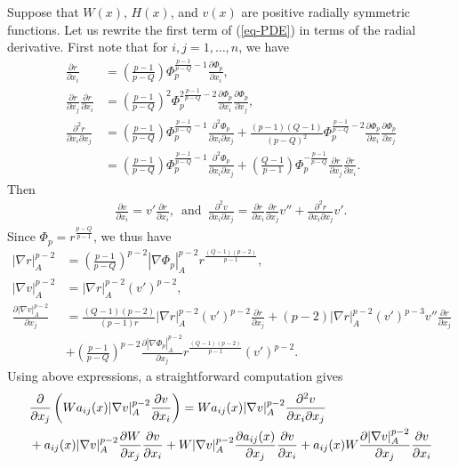 \documentclass[a4paper,12pt,reqno]{amsart}
\renewcommand\eqref[1]{(\ref{#1})} %
\theoremstyle{theorem}
\numberwithin{equation}{section}
\theoremstyle{plain}
\theoremstyle{definition}
\theoremstyle{defi}
\begin{document}
Suppose that $W(x)$, $H(x)$, and $v(x)$ are positive radially symmetric functions. 
Let us rewrite the first term of \eqref{eq-PDE} in terms of the radial derivative. First note that for $i,j=1,\ldots,n$, we have
\begin{align}
\frac{\partial r}{\partial x_i} &= \left(\frac{p-1}{p-Q}\right) \Phi_p^{\frac{p-1}{p-Q}-1} \frac{\partial \Phi_p}{\partial x_i},\label{2.5}\\
\frac{\partial r}{\partial x_j}	\frac{\partial r}{\partial x_i} &= \left(\frac{p-1}{p-Q}\right)^2 \Phi_p^{2\frac{p-1}{p-Q}-2} \frac{\partial \Phi_p}{\partial x_i}\frac{\partial \Phi_p}{\partial x_j},\\
\frac{\partial^2 r}{\partial x_i \partial x_j} &= \left(\frac{p-1}{p-Q}\right) \Phi_p^{\frac{p-1}{p-Q}-1} \frac{\partial^2 \Phi_p}{\partial x_i\partial x_j} + \frac{(p-1)(Q-1)}{(p-Q)^2} \Phi_p^{\frac{p-1}{p-Q}-2} \frac{\partial \Phi_p}{\partial x_i}\frac{\partial \Phi_p}{\partial x_j}\\
&=  \left(\frac{p-1}{p-Q}\right) \Phi_p^{\frac{p-1}{p-Q}-1} \frac{\partial^2 \Phi_p}{\partial x_i\partial x_j} + \left(\frac{Q-1}{p-1}\right)\Phi_p^{-\frac{p-1}{p-Q}}\frac{\partial r}{\partial x_j}	\frac{\partial r}{\partial x_i}. \nonumber
\end{align} 
Then
\begin{align*}
\frac{\partial v}{\partial x_i} = v' \frac{\partial r}{\partial x_i}, \,\,\, \text{and} \,\,\, \frac{\partial^2 v}{\partial x_i \partial x_j} = \frac{\partial r}{\partial x_i}\frac{\partial r}{\partial x_j} v'' + \frac{\partial^2 r }{\partial x_i \partial x_j} v'.
\end{align*}
Since $\Phi_p = r^{\frac{p-Q}{p-1}}$, we thus have
\begin{align}
|\nabla r|^{p-2}_A &=\left( \frac{p-1}{p-Q}\right)^{p-2} |\nabla \Phi_p|_A^{p-2} r^{\frac{(Q-1)(p-2)}{p-1}},\\ 
|\nabla v|^{p-2}_A &=|\nabla r|^{p-2}_A ( v')^{p-2}, \\
\frac{\partial |\nabla v|^{p-2}_A}{\partial x_j}& = \frac{(Q-1)(p-2)}{(p-1)r}|\nabla r|^{p-2}_A (v')^{p-2} \frac{\partial r}{\partial x_j} + (p-2)|\nabla r|^{p-2}_A (v')^{p-3} v'' \frac{\partial r}{\partial x_j} \\
& +\left( \frac{p-1}{p-Q}\right)^{p-2} \frac{\partial |\nabla \Phi_p|_A^{p-2}}{\partial x_j}r^{\frac{(Q-1)(p-2)}{p-1}}(v')^{p-2}.\nonumber
\end{align}
Using above expressions, a straightforward computation gives 
\begin{align*}
\small
&\frac{\partial}{\partial {x_j}} \left( W a_{ij}(x)|\nabla v|^{p-2}_A \frac{\partial v}{\partial x_i}  \right) =   W a_{ij}(x)|\nabla v|^{p-2}_A \frac{\partial^2 v}{\partial x_i\partial x_j} \\
&  + a_{ij}(x) |\nabla v|^{p-2}_A \frac{\partial W}{\partial x_j}\frac{\partial v}{\partial x_i} + W  |\nabla v|^{p-2}_A \frac{\partial a_{ij}(x)}{\partial x_j}\frac{\partial v}{\partial x_i} + a_{ij}(x)W\frac{\partial |\nabla v|^{p-2}_A }{\partial x_j} \frac{\partial v}{\partial x_i} 
\end{align*}
\end{document}
